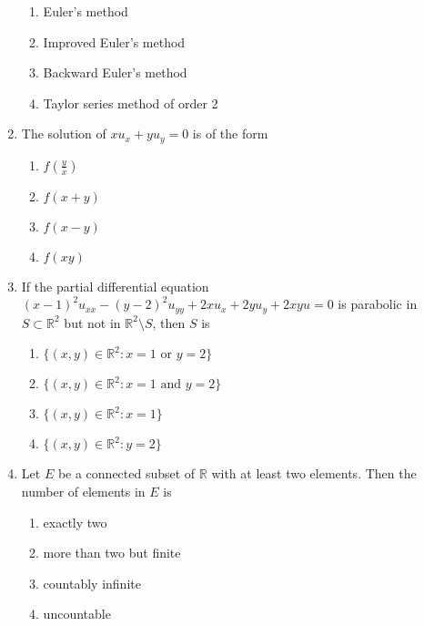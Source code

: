 \documentclass[journal,12pt,onecolumn]{IEEEtran}
\theoremstyle{remark}
\begin{document}
\begin{enumerate}
\begin{enumerate}
\item Euler's method
\item Improved Euler's method
\item Backward Euler's method
\item Taylor series method of order 2
\end{enumerate}


\item The solution of $xu_x + yu_y = 0$ is of the form
\\[-0.3em]\makebox[\textwidth][r]{\textit{[GATE EE 2025]}}

\begin{enumerate}
\item $f\left(\frac{y}{x}\right)$
\item $f(x+y)$
\item $f(x-y)$
\item $f(xy)$
\end{enumerate}


\item If the partial differential equation $(x-1)^2 u_{xx} - (y-2)^2 u_{yy} + 2xu_x + 2yu_y + 2xyu = 0$ is parabolic in $S \subset \mathbb{R}^2$ but not in $\mathbb{R}^2 \setminus S$, then $S$ is
\\[-0.3em]\makebox[\textwidth][r]{\textit{[GATE EE 2025]}}

\begin{enumerate}
\item $\{(x,y) \in \mathbb{R}^2 : x=1 \text{ or } y=2\}$
\item $\{(x,y) \in \mathbb{R}^2 : x=1 \text{ and } y=2\}$
\item $\{(x,y) \in \mathbb{R}^2 : x=1\}$
\item $\{(x,y) \in \mathbb{R}^2 : y=2\}$
\end{enumerate}


\item Let $E$ be a connected subset of $\mathbb{R}$ with at least two elements. Then the number of elements in $E$ is
\\[-0.3em]\makebox[\textwidth][r]{\textit{[GATE EE 2025]}}

\begin{enumerate}
\item exactly two
\item more than two but finite
\item countably infinite
\item uncountable
\end{enumerate}



\end{enumerate}
\end{document}
